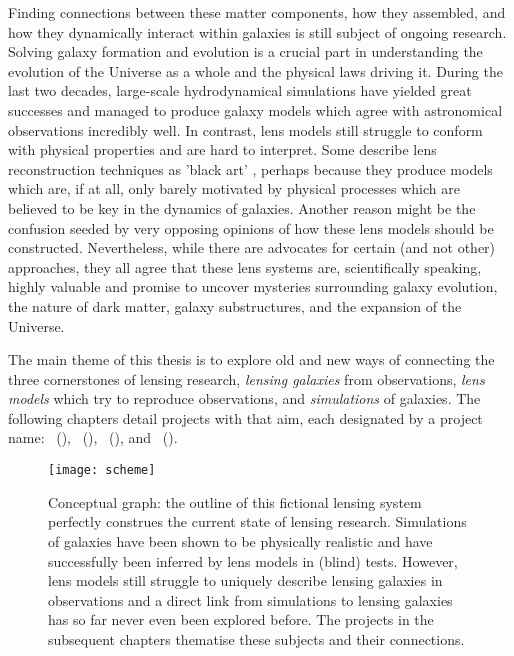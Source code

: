 Finding connections between these matter components, how they assembled, and how
they dynamically interact within galaxies is still subject of ongoing research.
Solving galaxy formation and evolution is a crucial part in understanding the
evolution of the Universe as a whole and the physical laws driving it.  During
the last two decades, large-scale hydrodynamical simulations have yielded great
successes and managed to produce galaxy models which agree with astronomical
observations incredibly well.  In contrast, lens models still struggle to
conform with physical properties and are hard to interpret.  Some describe lens
reconstruction techniques as 'black art' , perhaps because
they produce models which are, if at all, only barely motivated by physical
processes which are believed to be key in the dynamics of galaxies. Another
reason might be the confusion seeded by very opposing opinions
of how these lens models should be constructed.  Nevertheless, while there are
advocates for certain (and not other) approaches, they all agree that these lens
systems are, scientifically speaking, highly valuable and promise to uncover
mysteries surrounding galaxy evolution, the nature of dark matter, galaxy
substructures, and the expansion of the Universe.

The main theme of this thesis is to explore old and new ways of connecting the
three cornerstones of lensing research, \textit{lensing galaxies} from
observations, \textit{lens models} which try to reproduce observations, and
\textit{simulations} of galaxies.  The following chapters detail projects with
that aim, each designated by a project name: ~(),
~(), ~(), and
~().

%
\begin{figure}[h]%
    \centering%
    \texttt{[image: scheme]}%
    \caption[Conceptual research graph]{Conceptual graph: the outline of this
        fictional lensing system perfectly construes the current state of
        lensing research.  Simulations of galaxies have been shown to be
        physically realistic and have successfully been inferred by lens models
        in (blind) tests.  However, lens models still struggle to uniquely
        describe lensing galaxies in observations and a direct link from
        simulations to lensing galaxies has so far never even been explored
        before.  The projects in the subsequent chapters thematise these
        subjects and their connections.  }%
\end{figure}%
%

